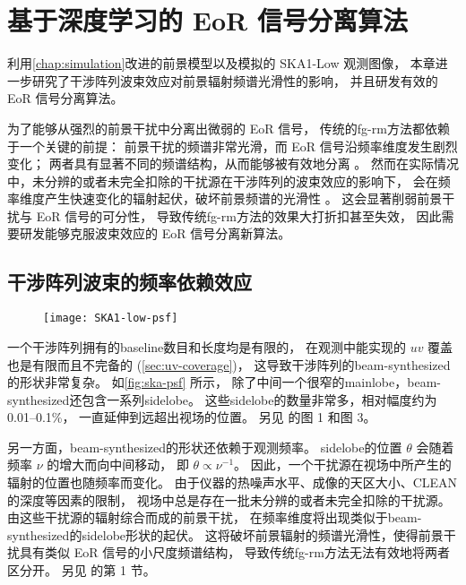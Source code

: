 
\chapter{基于深度学习的 EoR 信号分离算法}
\label{chap:cdae}

利用\autoref{chap:simulation}改进的前景模型以及模拟的 SKA1-Low 观测图像，
本章进一步研究了干涉阵列波束效应对前景辐射频谱光滑性的影响，
并且研发有效的 EoR 信号分离算法。

为了能够从强烈的前景干扰中分离出微弱的 EoR 信号，
传统的\ac{fg-rm}方法都依赖于一个关键的前提：
前景干扰的频谱非常光滑，而 EoR 信号沿频率维度发生剧烈变化；
两者具有显著不同的频谱结构，从而能够被有效地分离 \cite{morales2010,chapman2016}。
然而在实际情况中，未分辨的或者未完全扣除的干扰源在干涉阵列的波束效应的影响下，
会在频率维度产生快速变化的辐射起伏，破坏前景频谱的光滑性 \cite{liu2009ps}。
这会显著削弱前景干扰与 EoR 信号的可分性，
导致传统\ac{fg-rm}方法的效果大打折扣甚至失效，
因此需要研发能够克服波束效应的 EoR 信号分离新算法。


\section{干涉阵列波束的频率依赖效应}
\label{sec:beam-effect}

\begin{figure}[htp]
  \centering
  \texttt{[image: SKA1-low-psf]}
  \label{fig:ska-psf}
\end{figure}

一个干涉阵列拥有的\ac{baseline}数目和长度均是有限的，
在观测中能实现的 $uv$ 覆盖也是有限而且不完备的 (\autoref{sec:uv-coverage})，
这导致干涉阵列的\ac{beam-synthesized}的形状非常复杂。
如\autoref{fig:ska-psf} 所示，
除了中间一个很窄的\ac{mainlobe}，\ac{beam-synthesized}还包含一系列\ac{sidelobe}。
这些\ac{sidelobe}的数量非常多，相对幅度约为 \numrange{0.01}{0.1}\%，
一直延伸到远超出视场的位置。
另见  的图 1 和图 3。

另一方面，\ac{beam-synthesized}的形状还依赖于观测频率。
\ac{sidelobe}的位置 $\theta$ 会随着频率 $\nu$ 的增大而向中间移动，
即 $\theta \propto \nu^{-1}$。
因此，一个干扰源在视场中所产生的辐射的位置也随频率而变化。
由于仪器的热噪声水平、成像的天区大小、CLEAN 的深度等因素的限制，
视场中总是存在一批未分辨的或者未完全扣除的干扰源。
由这些干扰源的辐射综合而成的前景干扰，
在频率维度将出现类似于\ac{beam-synthesized}的\ac{sidelobe}形状的起伏。
这将破坏前景辐射的频谱光滑性，使得前景干扰具有类似 EoR 信号的小尺度频谱结构，
导致传统\ac{fg-rm}方法无法有效地将两者区分开。
另见  的第 1 节。


